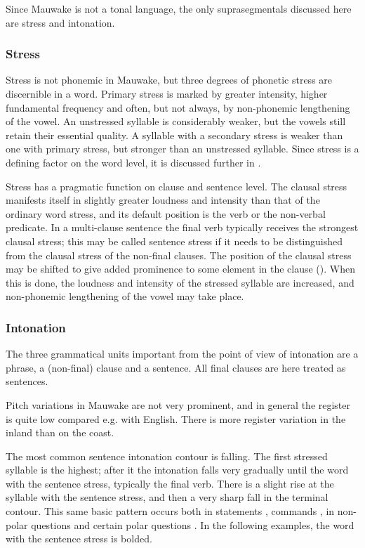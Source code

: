 Since Mauwake is not a tonal language, the only suprasegmentals discussed here are stress and intonation.

\subsubsection{Stress}\label{sec:2.1.3.1}


Stress is not phonemic in Mauwake, but three degrees of phonetic stress are discernible in a word.  Primary stress is marked by greater intensity, higher fundamental frequency and often, but not always, by non-phonemic lengthening of the vowel.  An unstressed syllable is considerably weaker, but the vowels still retain their essential quality.  A syllable with a secondary stress is weaker than one with primary stress, but stronger than an unstressed syllable. Since stress is a defining factor on the word level, it is discussed further in .

Stress has a pragmatic function on clause and sentence level. The clausal stress manifests itself in slightly greater loudness and intensity than that of the ordinary word stress, and its default position is the verb or the non-verbal predicate. In a multi-clause sentence the final verb typically receives the strongest clausal stress; this may be called sentence stress if it needs to be distinguished from the clausal stress of the non-final clauses. The position of the clausal stress may be shifted to give added prominence to some element in the clause (). When this is done, the loudness and intensity of the stressed syllable are increased, and non-phonemic lengthening of the vowel may take place.

\subsubsection{Intonation}\label{sec:2.1.3.2}


The three grammatical units important from the point of view of intonation are a phrase, a (non-final) clause and a sentence. All final clauses are here treated as sentences.

Pitch variations in Mauwake are not very prominent, and in general the register is quite low compared e.g. with English. There is more register variation in the inland than on the coast. 

The most common sentence intonation contour is falling. The first stressed syllable is the highest; after it the intonation falls very gradually until the word with the sentence stress, typically the final verb. There is a slight rise at the syllable with the sentence stress, and then a very sharp fall in the terminal contour.  This same basic pattern occurs both in statements , commands , in non-polar questions  and certain polar questions . In the following examples, the word with the sentence stress is bolded.


